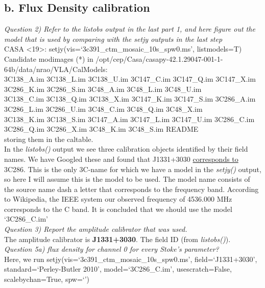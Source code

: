\documentclass[12pt, a4paper]{article}
\begin{document}
\subsection{b. Flux Density calibration}
\noindent \textit{Question 2) Refer to the listobs output in the last part 1, and here figure out the model that is used by comparing with the setjy outputs in the last step} \\ 
CASA <19>: setjy(vis=`3c391\_ctm\_mosaic\_10s\_spw0.ms', listmodels=T) \\

{\tiny \noindent Candidate modimages (*) in /opt/cep/Casa/casapy-42.1.29047-001-1-64b/data/nrao/VLA/CalModels: \\
3C138\_A.im  3C138\_L.im	3C138\_U.im  3C147\_C.im	3C147\_Q.im  3C147\_X.im	3C286\_K.im  3C286\_S.im	3C48\_A.im  3C48\_L.im  3C48\_U.im \\
3C138\_C.im  3C138\_Q.im	3C138\_X.im  3C147\_K.im	3C147\_S.im  3C286\_A.im	3C286\_L.im  3C286\_U.im	3C48\_C.im  3C48\_Q.im  3C48\_X.im \\
3C138\_K.im  3C138\_S.im	3C147\_A.im  3C147\_L.im	3C147\_U.im  3C286\_C.im	3C286\_Q.im  3C286\_X.im	3C48\_K.im  3C48\_S.im  README \\
storing them in the caltable.}  \\

In the \emph{listobs()} output we see three calibration objects identified by their field names. We have Googled these and found that J1331+3030 \href{http://casaguides.nrao.edu/index.php?title=EVLA_Continuum_Tutorial_3C391}{corresponds to} 3C286. This is the only 3C-name for which we have a model in the \emph{setjy()} output, so here I will assume this is the model to be used. The model name consists of the source name dash a letter that corresponds to the frequency band. According to Wikipedia, the IEEE system our observed frequency of 4536.000 MHz corresponds to the C band. It is concluded that we should use the model `3C286\_C.im' \\

\noindent \textit{Question 3) Report the amplitude calibrator that was used.} \\
The amplitude calibrator is \textbf{J1331+3030}. The field ID (from \emph{listobs()}). \\

\noindent \textit{Question 5a) flux density for channel 0 for every Stoke’s parameter?} \\
Here, we run setjy(vis=`3c391\_ctm\_mosaic\_10s\_spw0.ms', field=`J1331+3030', standard=`Perley-Butler 2010', model=`3C286\_C.im', usescratch=False, scalebychan=True, spw=`')
\end{document}

